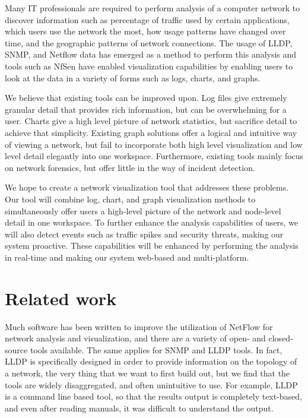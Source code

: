 \documentclass{sig-alternate}
\begin{document}
Many IT professionals are required to perform analysis of a computer network to
discover information such as percentage of traffic used by certain applications,
which users use the network the most, how usage patterns have changed over time,
and the geographic patterns of network connections. The usage of LLDP, SNMP, and
Netflow data has emerged as a method to perform this analysis and tools such as
NfSen have enabled visualization capabilities by enabling users to look at the
data in a variety of forms such as logs, charts, and graphs.

We believe that existing tools can be improved upon. Log files give extremely
granular detail that provides rich information, but can be overwhelming for a
user. Charts give a high level picture of network statistics, but sacrifice
detail to achieve that simplicity. Existing graph solutions offer a logical and
intuitive way of viewing a network, but fail to incorporate both high level
visualization and low level detail elegantly into one workspace. Furthermore,
existing tools mainly focus on network forensics, but offer little in the way of
incident detection.

We hope to create a network visualization tool that addresses these problems.
Our tool will combine log, chart, and graph visualization methods to
simultaneously offer users a high-level picture of the network and node-level
detail in one workspace. To further enhance the analysis capabilities of users,
we will also detect events such as traffic spikes and security threats, making
our system proactive. These capabilities will be enhanced by performing the
analysis in real-time and making our system web-based and multi-platform.

\section{Related work}

Much software has been written to improve the utilization of NetFlow for network
analysis and visualization, and there are a variety of open- and closed-source
tools available. The same applies for SNMP and LLDP tools. In fact, LLDP is
specifically designed in order to provide information on the topology of a
network, the very thing that we want to first build out, but we find that the
tools are widely disaggregated, and often unintuitive to use. For example, LLDP
is a command line based tool, so that the results output is completely
text-based, and even after reading manuals, it was difficult to understand the
output.
\end{document}
